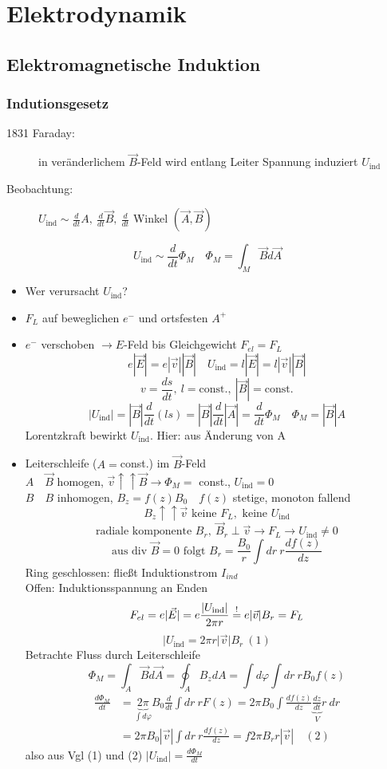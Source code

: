 \documentclass[titlepage,12pt,a4paper,ngerman]{report}
\newcommand{\tx}[1]{\textrm{#1}}
\newcommand{\uind}{U_{\tx{ind}}}
\begin{document}
\chapter{Elektrodynamik}
\setcounter{section}{9}
\section{Elektromagnetische Induktion}
\subsection{Indutionsgesetz}
\begin{description}
	\item [1831 Faraday:] in veränderlichem $\vec{B}$-Feld wird entlang Leiter Spannung induziert $\uind$
	\item [Beobachtung:] $\uind \sim \frac{d}{dt}A,\ \frac{d}{dt} \vec{B},\ \frac{d}{dt}$ Winkel $(\vec{A},\vec{B})$
\end{description}
$$ \uind \sim \frac{d}{dt} \Phi_{M} \quad \Phi_{M} = \int_M \vec{B} d \vec{A} $$
\begin{itemize}
	\item Wer verursacht $\uind$?
	\item $F_L$ auf beweglichen $e^-$ und ortsfesten $A^+$
	\item $e^-$ verschoben $\rightarrow E$-Feld bis Gleichgewicht $F_{el} = F_L$
	$$e|\vec{E}| = e |\vec{v}||\vec{B}| \quad \uind = l |\vec{E}| = l|\vec{v}||\vec{B}|$$
	$$v = \frac{ds}{dt},\ l=\tx{const.},\ |\vec{B}| = \tx{const.}$$
	$$|\uind| = |\vec{B}|\frac{d}{dt}(ls) = |\vec{B}| \frac{d}{dt}|\vec{A}| = \frac{d}{dt}\Phi_M \quad \Phi_M = |\vec{B}|A$$
	Lorentzkraft bewirkt $\uind$. Hier: aus Änderung von A
	\item Leiterschleife ($A=$const.) im $\vec{B}$-Feld\\
	$\boxed{A} \quad \vec{B}$ homogen, $\vec{v} \uparrow \uparrow \vec{B} \rightarrow \Phi_M = $ const., $\uind = 0$\\
	$\boxed{B} \quad B$ inhomogen, $B_z = f(z) B_0 \quad f(z)$ stetige, monoton fallend
	$$B_z \uparrow\uparrow \vec{v} \tx{ keine } F_L, \tx{ keine } \uind$$
	$$\tx{radiale komponente }B_r,\ \vec{B}_r \perp \vec{v} \rightarrow F_L \rightarrow \uind \neq 0$$
	$$\tx{aus div }\vec{B} =0 \tx{ folgt } B_r = \frac{B_0}{r} \int dr\ r \frac{df(z)}{dz}$$
	Ring geschlossen: fließt Induktionstrom $I_{ind}$\\
	Offen: Induktionsspannung an Enden
	$$F_{el} = e |\vec{E}| = e \frac{|\uind|}{2\pi r} \buildrel ! \over = e|\vec{v}| B_r = F_L$$
	$$|\uind = 2\pi r |\vec{v}| B_r\ (1)$$
	Betrachte Fluss durch Leiterschleife
	$$\Phi_M = \int_A \vec{B}d\vec{A}= \oint_A B_z dA = \int d \varphi \int dr\ r B_0 f(z)$$
	\begin{align*}
	\frac{d \Phi_M}{dt} &= \underbrace{2 \pi}_{\int d \varphi} B_0 \frac{d}{dt} \int dr\ r F(z) = 2 \pi B_0 \int \frac{df(z)}{dz}\underbrace{\frac{dz}{dt}}_{V}r\ dr\\
	&= 2\pi B_0 |\vec{v}| \int dr\ r \frac{df(z)}{dz} = f2\pi B_r r |\vec{v}| \quad (2)
	\end{align*}
	also aus Vgl (1) und (2) $|\uind| = \frac{d \Phi_M}{dt}$
\end{itemize}
\end{document}
